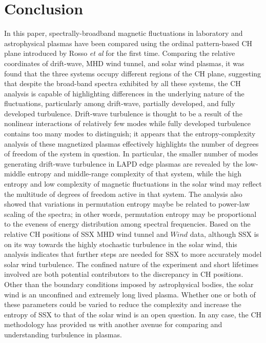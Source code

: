 \documentclass[aps,prx,twocolumn,secnumarabic,nobalancelastpage,amsmath,amssymb,
nofootinbib]{revtex4-1}
\begin{document}
\section{Conclusion}
In this paper, spectrally-broadband magnetic fluctuations in laboratory and astrophysical plasmas have been compared using the ordinal pattern-based CH plane introduced by Rosso \textit{et al} for the first time. Comparing the relative coordinates of drift-wave, MHD wind tunnel, and solar wind plasmas, it was found that the three systems occupy different regions of the CH plane, suggesting that despite the broad-band spectra exhibited by all these systems, the CH analysis is capable of highlighting differences in the underlying nature of the fluctuations, particularly among drift-wave, partially developed, and fully developed turbulence. Drift-wave turbulence is thought to be a result of the nonlinear interactions of relatively few modes while fully developed turbulence contains too many modes to distinguish; it appears that the entropy-complexity analysis of these magnetized plasmas effectively highlights the number of degrees of freedom of the system in question. In particular, the smaller number of modes generating drift-wave turbulence in LAPD edge plasmas are revealed by the low-middle entropy and middle-range complexity of that system, while the high entropy and low complexity of magnetic fluctuations in the solar wind may reflect the multitude of degrees of freedom active in that system. The analysis also showed that variations in permutation entropy maybe be related to power-law scaling of the spectra; in other words, permutation entropy may be proportional to the eveness of energy distribution among spectral frequencies. Based on the relative CH positions of SSX MHD wind tunnel and $\textit{Wind}$ data, although SSX is on its way towards the highly stochastic turbulence in the solar wind, this analysis indicates that further steps are needed for SSX  to more accurately model solar wind turbulence. The confined nature of the experiment and short lifetimes involved are both potential contributors to the discrepancy in CH positions. Other than the boundary conditions imposed by astrophysical bodies, the solar wind is an unconfined and extremely long lived plasma. Whether one or both of these parameters could be varied to reduce the complexity and increase the entropy of SSX to that of the solar wind is an open question. In any case, the CH methodology has provided us with another avenue for comparing and understanding turbulence in plasmas.
\end{document}
